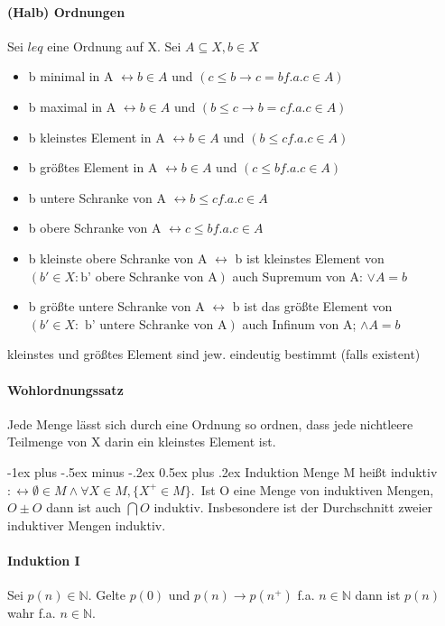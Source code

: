 \documentclass[10pt,landscape]{article}
\makeatletter
\renewcommand{\section}{\@startsection{section}{1}{0mm}%
                                {-1ex plus -.5ex minus -.2ex}%
                                {0.5ex plus .2ex}%
                                {\normalfont\large\bfseries}}
\makeatother
\begin{document}
\begin{multicols}{3}
\paragraph{(Halb) Ordnungen}
Sei $leq$ eine Ordnung auf X. Sei $A\subseteq X, b\in X$
\begin{itemize}
    \item b minimal in A $\leftrightarrow b\in A$ und $(c\leq b \rightarrow c=b f.a. c\in A)$
    \item b maximal in A $\leftrightarrow b\in A$ und $(b\leq c \rightarrow b=c f.a. c\in A)$
    \item b kleinstes Element in A $\leftrightarrow b\in A$ und $(b\leq c f.a. c\in A)$
    \item b größtes Element in A $\leftrightarrow b\in A$ und $(c\leq b f.a. c\in A)$
    \item b untere Schranke von A $\leftrightarrow b\leq c f.a. c\in A$
    \item b obere Schranke von A $\leftrightarrow c\leq b f.a. c\in A$
    \item b kleinste obere Schranke von A $\leftrightarrow$ b ist kleinstes Element von $(b'\in X: \text{b' obere Schranke von A})$ auch Supremum von A: $\lor A = b$
    \item b größte untere Schranke von A $\leftrightarrow$ b ist das größte Element von $(b'\in X: \text{ b' untere Schranke von A} )$ auch Infinum von A; $\land A = b$
\end{itemize}
kleinstes und größtes Element sind jew. eindeutig bestimmt (falls existent)

\paragraph{Wohlordnungssatz}
Jede Menge lässt sich durch eine Ordnung so ordnen, dass jede nichtleere Teilmenge von X darin ein kleinstes Element ist.

\section{Induktion}
Menge M heißt induktiv $:\leftrightarrow \emptyset \in M \wedge \forall X \in M, \{X^+ \in M\}$.\
Ist O eine Menge von induktiven Mengen, $O\pm O$ dann ist auch $\bigcap O$ induktiv. Insbesondere ist der Durchschnitt zweier induktiver Mengen induktiv.

\paragraph{Induktion I}
Sei $p(n)\in \mathbb{N}$. Gelte $p(0)$ und $p(n)\rightarrow p(n^{+})$ f.a. $n\in \mathbb{N}$ dann ist $p(n)$ wahr f.a. $n \in \mathbb{N}$. 


\end{multicols}
\end{document}
